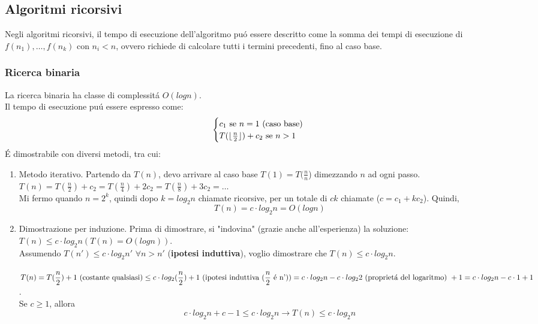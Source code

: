 \documentclass{article}
\DeclarePairedDelimiter\floor{\lfloor}{\rfloor}
\begin{document}
\subsection{Algoritmi ricorsivi}
Negli algoritmi ricorsivi, il tempo di esecuzione dell'algoritmo puó essere descritto come la somma dei tempi di esecuzione di $f(n_1), \dots , f(n_k)$ con $n_i < n$, ovvero richiede di calcolare tutti i termini precedenti, fino al caso base.

\subsubsection{Ricerca binaria}
La ricerca binaria ha classe di complessitá $O(logn)$.\\
Il tempo di esecuzione puú essere espresso come:
\begin{equation}
	\begin{cases}
		c_1 \mbox{ se } n = 1 \mbox{ (caso base)} \\
		T(\floor{\frac{n}{2} }) 
		+ c_2 \mbox{ se } n > 1
	\end{cases}
\end{equation}
É dimostrabile con diversi metodi, tra cui:
\begin{enumerate}
	\item Metodo iterativo. Partendo da $\displaystyle T(n)$, devo arrivare al caso base $T(1) = T(\frac{n}{n}$) dimezzando $n$ ad ogni passo. $T(n) = T(\frac{n}{2}) + c_2 = T(\frac{n}{4}) + 2c_2 = T(\frac{n}{8}) + 3c_2 = \dots$\\
	Mi fermo quando $n = 2^k$, quindi dopo $k = log_2{n}$ chiamate ricorsive, per un totale di $ck$ chiamate ($c = c_1 + kc_2$). Quindi, $$T(n) = c \cdot log_2{n} = O(logn)$$
	\item Dimostrazione per induzione. Prima di dimostrare, si "indovina" (grazie anche all'esperienza) la soluzione: $T(n) \le c \cdot log_2{n} (T(n) = O(logn))$.\\
	Assumendo $T(n') \le c \cdot log_2{n'}$  $\forall n > n'$ (\textbf{ipotesi induttiva}), voglio dimostrare che $T(n) \le c \cdot log_2{n}$.\\\\
	$\displaystyle T(n) = T(\frac{n}{2}) + 1 \mbox{ (costante qualsiasi)} \le c \cdot log_2(\frac{n}{2}) + 1 \mbox{ (ipotesi induttiva (} \frac{n}{2} \mbox{ é n'))} \\
	= c \cdot log_2{n} - c \cdot log_2{2} \mbox{ (proprietá del logaritmo) } + 1 \\
	= c \cdot log_2{n} - c \cdot 1 + 1$.\\
	Se $c \ge 1$, allora $$c \cdot log_2{n} + c - 1 \le c \cdot log_2{n} \rightarrow T(n) \le c \cdot log_2{n}$$
\end{enumerate}
\end{document}

